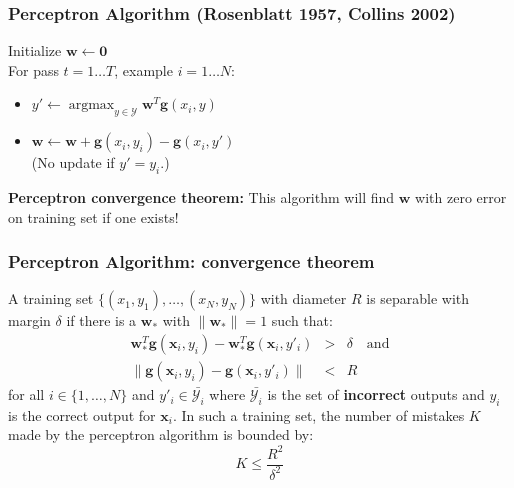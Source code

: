 \documentclass[ignorenonframetext,plain]{beamer}
\DeclareMathOperator*{\argmax}{argmax}
\renewcommand{\vec}{\mathbf}
\begin{document}
\begin{frame}\frametitle{Perceptron Algorithm (Rosenblatt 1957,
    Collins 2002)} %
Initialize $\vec{w} \leftarrow \vec{0}$\\
For pass $t=1\dots T$, example $i=1\dots N$:\\
\begin{itemize}
\item $y' \leftarrow \argmax_{y\in\mathcal{Y}}
    \vec{w}^T\vec{g}(x_i, y)$
\item $\vec{w} \leftarrow \vec{w} 
+\vec{g}(x_i,y_i)
-\vec{g}(x_i,y')$ \\
\small (No update if $y'=y_i$.)
\end{itemize}
\vspace{5mm}
{\bf Perceptron convergence theorem:} This algorithm will find
$\vec{w}$ with zero error on training set if one exists!
\end{frame}

\begin{frame}\frametitle{Perceptron Algorithm: convergence theorem}
A training set $\{(x_1,y_1),\dots,(x_N,y_N)\}$ with diameter $R$ is
separable with margin $\delta$ if there is a $\vec{w}_*$ with
$\|\vec{w}_*\|=1$ such that: \begin{eqnarray*}
  \vec{w}_*^T\vec{g}(\vec{x}_i,y_i) - \vec{w}_*^T\vec{g}(\vec{x}_i,y'_i)
  &>& \delta \quad\text{and}\\ \|\vec{g}(\vec{x}_i, y_i) -
  \vec{g}(\vec{x}_i, y'_i)\| &<& R
\end{eqnarray*}
for all $i \in \{1,\dots,N\}$ and $y'_i \in \bar{\mathcal{Y}_i}$ where
$\bar{\mathcal{Y}_i}$ is the set of {\bf incorrect} outputs and $y_i$
is the correct output for $\vec{x}_i$.  In such a training set, the
number of mistakes $K$ made by the perceptron algorithm is bounded
by: \[ K \leq \frac{R^2}{\delta^2}
\]
\end{frame}
\end{document}
